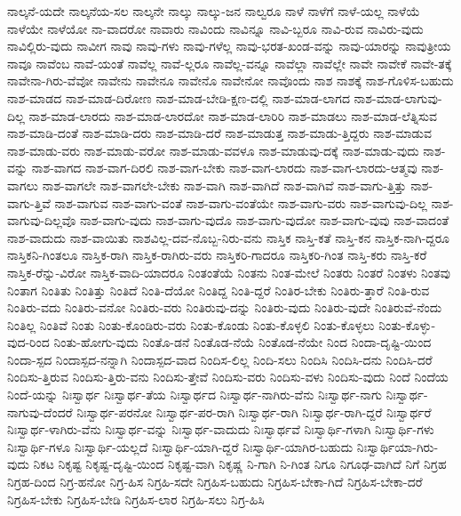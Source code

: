 {ನಾಲ್ಕನೆ-ಯದೇ
ನಾಲ್ಕನೆಯ-ಸಲ
ನಾಲ್ಕನೇ
ನಾಲ್ಕು
ನಾಲ್ಕು-ಜನ
ನಾಲ್ವರೂ
ನಾಳೆ
ನಾಳೆಗೆ
ನಾಳೆ-ಯಲ್ಲ
ನಾಳೆಯೆ
ನಾಳೆಯೇ
ನಾಳೆಯೋ
ನಾ-ವಾದರೋ
ನಾವಾರು
ನಾವಿಂದು
ನಾವಿನ್ನೂ
ನಾವಿ-ಬ್ಬರೂ
ನಾವಿ-ರುವ
ನಾವಿರು-ವುದು
ನಾವಿಲ್ಲಿರು-ವುದು
ನಾವೀಗ
ನಾವು
ನಾವು-ಗಳು
ನಾವು-ಗಳೆಲ್ಲ
ನಾವು-ಭರತ-ಖಂಡ-ವನ್ನು
ನಾವು-ಯಾರನ್ನು
ನಾವುತ್ರೀಯ
ನಾವೂ
ನಾವೆಂಬ
ನಾವೆ-ಯಂತೆ
ನಾವೆಲ್ಲ
ನಾವೆ-ಲ್ಲರೂ
ನಾವೆಲ್ಲ-ವನ್ನೂ
ನಾವೆಲ್ಲಾ
ನಾವೆಲ್ಲೇ
ನಾವೇ
ನಾವೇಕೆ
ನಾವೇ-ತಕ್ಕೆ
ನಾವೇನಾ-ಗಿರು-ವೆವೋ
ನಾವೇನು
ನಾವೇನೂ
ನಾವೇನೊ
ನಾವೇನೋ
ನಾವೊಂದು
ನಾಶ
ನಾಶಕ್ಕೆ
ನಾಶ-ಗೊಳಿಸ-ಬಹುದು
ನಾಶ-ಮಾಡದ
ನಾಶ-ಮಾಡ-ದಿರೋಣ
ನಾಶ-ಮಾಡ-ಬೇಡಿ-ಕ್ಷಣ-ದಲ್ಲಿ
ನಾಶ-ಮಾಡ-ಲಾಗದ
ನಾಶ-ಮಾಡ-ಲಾಗುವು-ದಿಲ್ಲ
ನಾಶ-ಮಾಡ-ಲಾರದು
ನಾಶ-ಮಾಡ-ಲಾರದೋ
ನಾಶ-ಮಾಡ-ಲಾರಿರಿ
ನಾಶ-ಮಾಡಲು
ನಾಶ-ಮಾಡ-ಲೆತ್ನಿಸುವ
ನಾಶ-ಮಾಡಿ-ದಂತೆ
ನಾಶ-ಮಾಡಿ-ದರು
ನಾಶ-ಮಾಡಿ-ದರೆ
ನಾಶ-ಮಾಡುತ್ತ
ನಾಶ-ಮಾಡು-ತ್ತಿದ್ದರು
ನಾಶ-ಮಾಡುವ
ನಾಶ-ಮಾಡು-ವರು
ನಾಶ-ಮಾಡು-ವರೋ
ನಾಶ-ಮಾಡು-ವವಳೂ
ನಾಶ-ಮಾಡುವು-ದಕ್ಕೆ
ನಾಶ-ಮಾಡು-ವುದು
ನಾಶ-ವನ್ನು
ನಾಶ-ವಾಗದ
ನಾಶ-ವಾಗ-ದಿರಲಿ
ನಾಶ-ವಾಗ-ಬೇಕು
ನಾಶ-ವಾಗ-ಲಾರದು
ನಾಶ-ವಾಗ-ಲಾರದು-ಆತ್ಮವು
ನಾಶ-ವಾಗಲು
ನಾಶ-ವಾಗಲೇ
ನಾಶ-ವಾಗಲೇ-ಬೇಕು
ನಾಶ-ವಾಗಿ
ನಾಶ-ವಾಗಿದೆ
ನಾಶ-ವಾಗಿವೆ
ನಾಶ-ವಾಗು-ತ್ತಿತ್ತು
ನಾಶ-ವಾಗು-ತ್ತಿವೆ
ನಾಶ-ವಾಗುವ
ನಾಶ-ವಾಗು-ವಂತೆ
ನಾಶ-ವಾಗು-ವಂತೆಯೇ
ನಾಶ-ವಾಗು-ವರು
ನಾಶ-ವಾಗುವು-ದಿಲ್ಲ
ನಾಶ-ವಾಗುವು-ದಿಲ್ಲವೊ
ನಾಶ-ವಾಗು-ವುದು
ನಾಶ-ವಾಗು-ವುದೊ
ನಾಶ-ವಾಗು-ವುದೋ
ನಾಶ-ವಾಗು-ವುವು
ನಾಶ-ವಾದಂತೆ
ನಾಶ-ವಾದುದು
ನಾಶ-ವಾಯಿತು
ನಾಶವಿಲ್ಲ-ದವ-ನೊಬ್ಬ-ನಿರು-ವನು
ನಾಸ್ತಿಕ
ನಾಸ್ತಿ-ಕತೆ
ನಾಸ್ತಿ-ಕನ
ನಾಸ್ತಿಕ-ನಾಗಿ-ದ್ದರೂ
ನಾಸ್ತಿಕನಿ-ಗಿಂತಲೂ
ನಾಸ್ತಿಕ-ರಾಗಿ
ನಾಸ್ತಿಕ-ರಾಗಿರು-ವರು
ನಾಸ್ತಿಕರಿ-ಗಾದರೂ
ನಾಸ್ತಿಕರಿ-ಗಿಂತ
ನಾಸ್ತಿ-ಕರು
ನಾಸ್ತಿ-ಕರೆ
ನಾಸ್ತಿಕ-ರೆನ್ನು-ವಿರೋ
ನಾಸ್ತಿಕ-ವಾದಿ-ಯಾದರೂ
ನಿಂತಂತೆಯೆ
ನಿಂತನು
ನಿಂತ-ಮೇಲೆ
ನಿಂತರು
ನಿಂತರೆ
ನಿಂತಳು
ನಿಂತವು
ನಿಂತಾಗ
ನಿಂತಿತು
ನಿಂತಿತ್ತು
ನಿಂತಿದೆ
ನಿಂತಿ-ದೆಯೋ
ನಿಂತಿದ್ದ
ನಿಂತಿ-ದ್ದರೆ
ನಿಂತಿರ-ಬೇಕು
ನಿಂತಿರು-ತ್ತಾರೆ
ನಿಂತಿ-ರುವ
ನಿಂತಿರು-ವದು
ನಿಂತಿರು-ವನೋ
ನಿಂತಿರು-ವರು
ನಿಂತಿರುವು-ದನ್ನು
ನಿಂತಿರು-ವುದು
ನಿಂತಿರು-ವುದೇ
ನಿಂತಿರುವೆ-ನೆಂದು
ನಿಂತಿಲ್ಲ
ನಿಂತಿವೆ
ನಿಂತು
ನಿಂತು-ಕೊಂಡಿರು-ವರು
ನಿಂತು-ಕೊಂಡು
ನಿಂತು-ಕೊಳ್ಳಲಿ
ನಿಂತು-ಕೊಳ್ಳಲು
ನಿಂತು-ಕೊಳ್ಳು-ವುದ-ರಿಂದ
ನಿಂತು-ಹೋಗು-ವುದು
ನಿಂತೊ-ಡನೆ
ನಿಂತೊಡ-ನೆಯೆ
ನಿಂತೊಡ-ನೆಯೇ
ನಿಂದ
ನಿಂದಾ-ದೃಷ್ಟಿ-ಯಿಂದ
ನಿಂದಾ-ಸ್ಪದ
ನಿಂದಾಸ್ಪದ-ನನ್ನಾಗಿ
ನಿಂದಾಸ್ಪದ-ವಾದ
ನಿಂದಿಸ-ಲಿಲ್ಲ
ನಿಂದಿ-ಸಲು
ನಿಂದಿಸಿ
ನಿಂದಿಸಿ-ದನು
ನಿಂದಿಸಿ-ದರೆ
ನಿಂದಿಸು-ತ್ತಿರುವ
ನಿಂದಿಸು-ತ್ತಿರು-ವನು
ನಿಂದಿಸು-ತ್ತೇವೆ
ನಿಂದಿಸು-ವರು
ನಿಂದಿಸು-ವಳು
ನಿಂದಿಸು-ವುದು
ನಿಂದೆ
ನಿಂದೆಯ
ನಿಂದೆ-ಯನ್ನು
ನಿಃಸ್ವಾರ್ಥ
ನಿಃಸ್ವಾರ್ಥ-ತೆಯ
ನಿಃಸ್ವಾರ್ಥದ
ನಿಃಸ್ವಾರ್ಥ-ನಾಗಿರು-ವೆನು
ನಿಃಸ್ವಾರ್ಥ-ನಾಗು
ನಿಃಸ್ವಾರ್ಥ-ನಾಗುವು-ದೆಂದರೆ
ನಿಃಸ್ವಾರ್ಥ-ಪರನೋ
ನಿಃಸ್ವಾರ್ಥ-ಪರ-ರಾಗಿ
ನಿಃಸ್ವಾರ್ಥ-ರಾಗಿ
ನಿಃಸ್ವಾರ್ಥ-ರಾಗಿ-ದ್ದರೆ
ನಿಃಸ್ವಾರ್ಥರೆ
ನಿಃಸ್ವಾರ್ಥ-ಳಾಗಿರು-ವೆನು
ನಿಃಸ್ವಾರ್ಥ-ವನ್ನು
ನಿಃಸ್ವಾರ್ಥ-ವಾದುದು
ನಿಃಸ್ವಾರ್ಥವೆ
ನಿಃಸ್ವಾರ್ಥಿ-ಗಳಾಗಿ
ನಿಃಸ್ವಾರ್ಥಿ-ಗಳು
ನಿಃಸ್ವಾರ್ಥಿ-ಗಳೂ
ನಿಃಸ್ವಾರ್ಥಿ-ಯಲ್ಲದೆ
ನಿಃಸ್ವಾರ್ಥಿ-ಯಾಗಿ-ದ್ದರೆ
ನಿಃಸ್ವಾರ್ಥಿ-ಯಾಗಿರ-ಬಹುದು
ನಿಃಸ್ವಾರ್ಥಿಯಾ-ಗಿರು-ವುದು
ನಿಕಟ
ನಿಕೃಷ್ಟ
ನಿಕೃಷ್ಟ-ದೃಷ್ಟಿ-ಯಿಂದ
ನಿಕೃಷ್ಟ-ವಾಗಿ
ನಿಕೃಷ್ಣ
ನಿ-ಗಾಗಿ
ನಿ-ಗಿಂತ
ನಿಗೂ
ನಿಗೂಢ-ವಾಗಿದೆ
ನಿಗೆ
ನಿಗ್ರಹ
ನಿಗ್ರಹ-ದಿಂದ
ನಿಗ್ರ-ಹನೋ
ನಿಗ್ರ-ಹಿಸ
ನಿಗ್ರಹಿ-ಸದೇ
ನಿಗ್ರಹಿಸ-ಬಹುದು
ನಿಗ್ರಹಿಸ-ಬೇಕಾ-ಗಿದೆ
ನಿಗ್ರಹಿಸ-ಬೇಕಾ-ದರೆ
ನಿಗ್ರಹಿಸ-ಬೇಕು
ನಿಗ್ರಹಿಸ-ಬೇಡಿ
ನಿಗ್ರಹಿಸ-ಲಾರ
ನಿಗ್ರಹಿ-ಸಲು
ನಿಗ್ರ-ಹಿಸಿ
}
